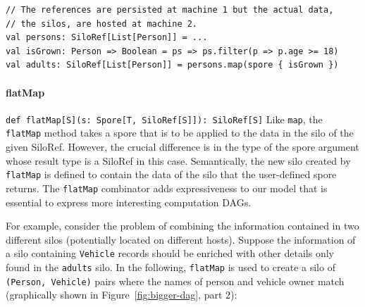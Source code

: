 \documentclass[preprint]{sigplanconf}
\theoremstyle{definition}
\theoremstyle{definition}
\begin{document}

\begin{lstlisting}
// The references are persisted at machine 1 but the actual data,
// the silos, are hosted at machine 2.
val persons: SiloRef[List[Person]] = ...
val isGrown: Person => Boolean = ps => ps.filter(p => p.age >= 18)
val adults: SiloRef[List[Person]] = persons.map(spore { isGrown })
\end{lstlisting}


\paragraph{flatMap}%
%
\texttt{def flatMap[S](s: Spore[T, SiloRef[S]]): SiloRef[S]} \newline
%
Like \verb|map|, the \verb|flatMap| method takes a spore that is to be applied
to the data in the silo of the given SiloRef. However, the crucial difference
is in the type of the spore argument whose result type is a SiloRef in this
case. Semantically, the new silo created by \verb|flatMap| is defined to
contain the data of the silo that the user-defined spore returns. The
\verb|flatMap| combinator adds expressiveness to our model that is essential to
express more interesting computation DAGs.

For example, consider the problem of combining the information contained in two 
different silos (potentially located on different hosts). Suppose the 
information of a silo containing \verb|Vehicle| records should be enriched with 
other details only found in the \verb|adults| silo. In the following, 
\verb|flatMap| is used to create a silo of \verb|(Person, Vehicle)| pairs where 
the names of person and vehicle owner match (graphically shown in 
Figure~\ref{fig:bigger-dag}, part 2):
\end{document}

